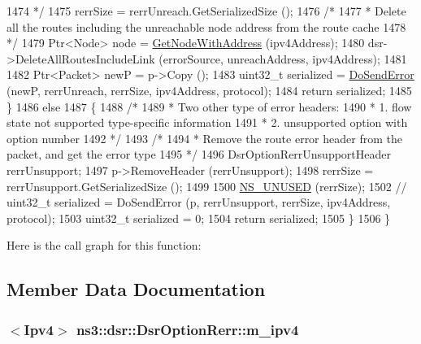 \begin{DoxyCode}
1474 \textcolor{comment}{       */}
1475       rerrSize = rerrUnreach.GetSerializedSize ();
1476       \textcolor{comment}{/*}
1477 \textcolor{comment}{       * Delete all the routes including the unreachable node address from the route cache}
1478 \textcolor{comment}{       */}
1479       Ptr<Node> node = \hyperlink{classns3_1_1dsr_1_1DsrOptions_a1a91f820f3d754a477a54bad547ca659}{GetNodeWithAddress} (ipv4Address);
1480       dsr->DeleteAllRoutesIncludeLink (errorSource, unreachAddress, ipv4Address);
1481 
1482       Ptr<Packet> newP = p->Copy ();
1483       uint32\_t serialized = \hyperlink{classns3_1_1dsr_1_1DsrOptionRerr_a0384af99022d7c4f59cc5f548990e827}{DoSendError} (newP, rerrUnreach, rerrSize, ipv4Address, protocol);
1484       \textcolor{keywordflow}{return} serialized;
1485     \}
1486   \textcolor{keywordflow}{else}
1487     \{
1488       \textcolor{comment}{/*}
1489 \textcolor{comment}{       * Two other type of error headers:}
1490 \textcolor{comment}{       * 1. flow state not supported type-specific information}
1491 \textcolor{comment}{       * 2. unsupported option with option number}
1492 \textcolor{comment}{       */}
1493       \textcolor{comment}{/*}
1494 \textcolor{comment}{       * Remove the route error header from the packet, and get the error type}
1495 \textcolor{comment}{       */}
1496       DsrOptionRerrUnsupportHeader rerrUnsupport;
1497       p->RemoveHeader (rerrUnsupport);
1498       rerrSize = rerrUnsupport.GetSerializedSize ();
1499 
1500       \hyperlink{unused_8h_a3ba03ad859378e9f01285afb60f0e3ab}{NS\_UNUSED} (rerrSize);
1502       \textcolor{comment}{// uint32\_t serialized = DoSendError (p, rerrUnsupport, rerrSize, ipv4Address, protocol);}
1503       uint32\_t serialized = 0;
1504       \textcolor{keywordflow}{return} serialized;
1505     \}
1506 \}
\end{DoxyCode}


Here is the call graph for this function\+:




\subsection{Member Data Documentation}
\subsubsection[{\texorpdfstring{m\+\_\+ipv4}{m_ipv4}}]{$<${\bf Ipv4}$>$ ns3\+::dsr\+::\+Dsr\+Option\+Rerr\+::m\+\_\+ipv4\hspace{0.3cm}{\ttfamily [private]}}\hypertarget{classns3_1_1dsr_1_1DsrOptionRerr_a03813d39437d7932187ecd0033ac6fd3}{}\label{classns3_1_1dsr_1_1DsrOptionRerr_a03813d39437d7932187ecd0033ac6fd3}


